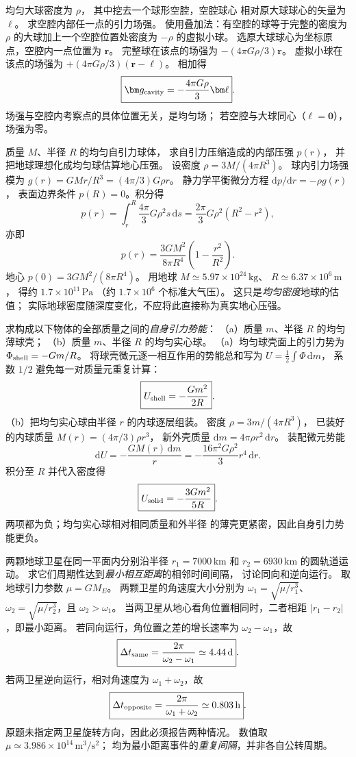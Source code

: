 均匀大球密度为 $\rho$，
其中挖去一个球形空腔，空腔球心
相对原大球球心的矢量为 $\bm \ell$。
求空腔内部任一点的引力场强。
\exsolution
使用叠加法：有空腔的球等于完整的密度为 $\rho$
的大球加上一个空腔位置处密度为 $-\rho$ 的虚拟小球。
选原大球球心为坐标原点，空腔内一点位置为 $\bm r$。
完整球在该点的场强为
$-(4\pi G\rho/3)\bm r$。
虚拟小球在该点的场强为
$+(4\pi G\rho/3)(\bm r-\bm\ell)$。
相加得
\[
\boxed{\bm g_{\rm cavity}=-\frac{4\pi G\rho}{3}\bm\ell}.
\]
\excheck 场强与空腔内考察点的具体位置无关，是均匀场；
若空腔与大球同心（$\bm\ell=\bm0$），场强为零。

质量 $M$、半径 $R$ 的均匀自引力球体，
求自引力压缩造成的内部压强 $p(r)$，
并把地球理想化成均匀球估算地心压强。
\exsolution
设密度 $\rho=3M/(4\pi R^3)$。
球内引力场强模为
$g(r)=GM r/R^3=(4\pi/3)G\rho r$。
静力学平衡微分方程
$\mathrm dp/\mathrm dr=-\rho g(r)$，
表面边界条件 $p(R)=0$。积分得
\[
p(r)=\int_r^R\frac{4\pi}{3}G\rho^2s\,\mathrm ds
=\frac{2\pi}{3}G\rho^2(R^2-r^2),
\]
亦即
\[
\boxed{p(r)=\frac{3GM^2}{8\pi R^4}
\left(1-\frac{r^2}{R^2}\right)}.
\]
地心 $p(0)=3GM^2/(8\pi R^4)$。
用地球 $M\simeq5.97\times10^{24}\,\mathrm{kg}$、
$R\simeq6.37\times10^6\,\mathrm m$，
得约 $1.7\times10^{11}\,\mathrm{Pa}$
（约 $1.7\times10^6$ 个标准大气压）。
\excheck 这只是\emph{均匀密度}地球的估值；
实际地球密度随深度变化，不应将此直接称为真实地心压强。

求构成以下物体的全部质量之间的\emph{自身引力势能}：
（a）质量 $m$、半径 $R$ 的均匀薄球壳；
（b）质量 $m$、半径 $R$ 的均匀实心球。
\exsolution
（a）均匀球壳面上的引力势为
$\Phi_{\rm shell}=-Gm/R$。
将球壳微元逐一相互作用的势能总和写为
$U=\tfrac12\int\Phi\,\mathrm dm$，
系数 $1/2$ 避免每一对质量元重复计算：
\[
\boxed{U_{\rm shell}=-\frac{Gm^2}{2R}}.
\]
（b）把均匀实心球由半径 $r$ 的内球逐层组装。
密度 $\rho=3m/(4\pi R^3)$，
已装好的内球质量 $M(r)=(4\pi/3)\rho r^3$，
新外壳质量 $\mathrm dm=4\pi\rho r^2\,\mathrm dr$。
装配微元势能
\[
\mathrm dU=-\frac{GM(r)\,\mathrm dm}{r}
=-\frac{16\pi^2G\rho^2}{3}r^4\,\mathrm dr.
\]
积分至 $R$ 并代入密度得
\[
\boxed{U_{\rm solid}=-\frac{3Gm^2}{5R}}.
\]
\excheck 两项都为负；均匀实心球相对相同质量和外半径
的薄壳更紧密，因此自身引力势能更负。

两颗地球卫星在同一平面内分别沿半径
$r_1=7000\,\mathrm{km}$ 和
$r_2=6930\,\mathrm{km}$ 的圆轨道运动。
求它们周期性达到\emph{最小相互距离}的相邻时间间隔，
讨论同向和逆向运行。
\exsolution
取地球引力参数 $\mu=GM_E$。
两颗卫星的角速度大小分别为
$\omega_1=\sqrt{\mu/r_1^3}$、
$\omega_2=\sqrt{\mu/r_2^3}$，且 $\omega_2>\omega_1$。
当两卫星从地心看角位置相同时，二者相距
$|r_1-r_2|$，即最小距离。
若同向运行，角位置之差的增长速率为
$\omega_2-\omega_1$，故
\[
\boxed{\Delta t_{\rm same}=
\frac{2\pi}{\omega_2-\omega_1}
\simeq4.44\,\mathrm d}.
\]
若两卫星逆向运行，相对角速度为
$\omega_1+\omega_2$，故
\[
\boxed{\Delta t_{\rm opposite}=
\frac{2\pi}{\omega_1+\omega_2}
\simeq0.803\,\mathrm h}.
\]
\excheck 原题未指定两卫星旋转方向，因此必须报告两种情况。
数值取 $\mu\simeq3.986\times10^{14}\,\mathrm{m^3/s^2}$；
均为最小距离事件的\emph{重复间隔}，并非各自公转周期。

